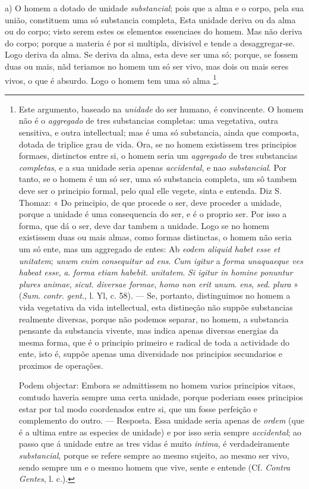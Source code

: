 a) O homem a dotado de unidade \emph{substancial}; pois que a alma e o corpo, pela sua união, constituem uma só substancia completa, Esta unidade deriva ou da alma ou do corpo; visto serem estes os elementos essenciaes do homem. Mas não deriva do corpo; porque a materia é por si multipla, divisivel e tende a desaggregar-se. Logo deriva da alma. Se deriva da alma, esta deve ser uma só; porque, se fossem duas ou mais,   nãd teriamos no homem um só ser vivo, mas dois ou mais seres vivos, o que é absurdo. Logo o homem tem uma só alma \footnote{Este argumento, baseado na \emph{unidade} do ser humano, é convincente. O homem não é o \emph{aggregado} de tres substancias completas: uma vegetativa, outra sensitiva, e outra intellectual; mas é uma só substancia, ainda que composta, dotada de triplice grau de vida. Ora, se no homem existissem tres principios formaes, distinctos entre si, o homem seria um \emph{aggregado} de tres substancias \emph{completas}, e a sua unidade seria apenas \emph{accidental}, e nao \emph{substancial}. Por tanto, se o homem é um só ser, uma só substancia completa, um sô tambem deve ser o principio formal, pelo qual elle vegete, sinta e entenda. Diz S. Thomaz: « Do principio, de que procede o ser, deve proceder a unidade, porque a unidade é uma consequencia do ser, e é o proprio ser. Por isso a forma, que dá o ser, deve dar tambem a unidade. Logo se no homem existissem duas ou mais almas, como formas distinctas, o homem não seria um só ente, mas um aggregado de entes: Ab \emph{eodem aliquid habet esse et unitatem}; \emph{unwm enim consequitur ad ens}. \emph{Cum igitur} a \emph{forma unaquaeque ves habeat esse}, \emph{a}. \emph{forma etiam habebit}. \emph{unitatem}. \emph{Si igitur in homine ponuntur plures animae}, \emph{sicut}. \emph{diversae formae}, \emph{homo non erit unum}. \emph{ens}, \emph{sed}. \emph{plura} » (\emph{Sum}. \emph{contr}. \emph{gent}., l. Yl, c. 58). --- Se, portanto, distinguimos no homem a vida vegetativa da vida intellectual, esta distineção não suppõe substancias realmente diversas, porque não podemos separar, no homem, a substancia pensante da substancia vivente, mas indica apenas diversas energias da mesma forma, que é o principio primeiro e radical de toda a actividade do ente, isto é, suppõe apenas uma diversidade nos principios secundarios e proximos de operações.\par Podem objectar: Embora se admittissem no homem varios principios vitaes, comtudo haveria sempre uma certa unidade, porque poderiam esses principios estar por tal modo coordenados entre si, que um fosse perfeição e complemento do outro. --- Resposta. Essa unidade seria apenas de \emph{ordem} (que é a ultima entre as especies de unidade) e por isso seria sempre \emph{accidental}; ao passo que á unidade entre as tres vidas é muito \emph{intima}, é verdadeiramente \emph{substancial}, porque se refere sempre ao mesmo sujeito, ao mesmo ser vivo, sendo sempre um e o mesmo homem que vive, sente e entende (Cf. \emph{Contra Gentes}, l. c.).}.

